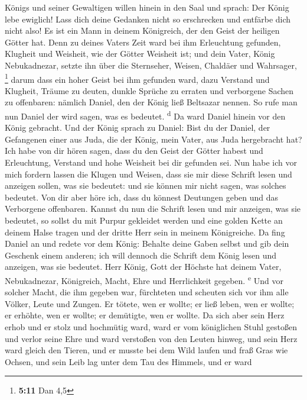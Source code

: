 Königs und seiner Gewaltigen willen hinein in den Saal und sprach: Der
König lebe ewiglich! Lass dich deine Gedanken nicht so erschrecken und
entfärbe dich nicht also!  Es ist ein Mann in deinem
Königreich, der den Geist der heiligen Götter hat. Denn zu deines Vaters
Zeit ward bei ihm Erleuchtung gefunden, Klugheit und Weisheit, wie der
Götter Weisheit ist; und dein Vater, König Nebukadnezar, setzte ihn über
die Sternseher, Weisen, Chaldäer und Wahrsager, \footnote{\textbf{5:11}
  Dan 4,5}  darum dass ein hoher Geist bei ihm gefunden
ward, dazu Verstand und Klugheit, Träume zu deuten, dunkle Sprüche zu
erraten und verborgene Sachen zu offenbaren: nämlich Daniel, den der
König ließ Beltsazar nennen. So rufe man nun Daniel der wird sagen, was
es bedeutet. \textsuperscript{d}  Da ward Daniel hinein
vor den König gebracht. Und der König sprach zu Daniel: Bist du der
Daniel, der Gefangenen einer aus Juda, die der König, mein Vater, aus
Juda hergebracht hat?  Ich habe von dir hören sagen, dass
du den Geist der Götter habest und Erleuchtung, Verstand und hohe
Weisheit bei dir gefunden sei.  Nun habe ich vor mich
fordern lassen die Klugen und Weisen, dass sie mir diese Schrift lesen
und anzeigen sollen, was sie bedeutet: und sie können mir nicht sagen,
was solches bedeutet.  Von dir aber höre ich, dass du
könnest Deutungen geben und das Verborgene offenbaren. Kannst du nun die
Schrift lesen und mir anzeigen, was sie bedeutet, so sollst du mit
Purpur gekleidet werden und eine golden Kette an deinem Halse tragen und
der dritte Herr sein in meinem Königreiche.  Da fing
Daniel an und redete vor dem König: Behalte deine Gaben selbst und gib
dein Geschenk einem anderen; ich will dennoch die Schrift dem König
lesen und anzeigen, was sie bedeutet.  Herr König, Gott
der Höchste hat deinem Vater, Nebukadnezar, Königreich, Macht, Ehre und
Herrlichkeit gegeben. \textsuperscript{e}  Und vor
solcher Macht, die ihm gegeben war, fürchteten und scheuten sich vor ihm
alle Völker, Leute und Zungen. Er tötete, wen er wollte; er ließ leben,
wen er wollte; er erhöhte, wen er wollte; er demütigte, wen er wollte.
 Da sich aber sein Herz erhob und er stolz und hochmütig
ward, ward er vom königlichen Stuhl gestoßen und verlor seine Ehre
 und ward verstoßen von den Leuten hinweg, und sein Herz
ward gleich den Tieren, und er musste bei dem Wild laufen und fraß Gras
wie Ochsen, und sein Leib lag unter dem Tau des Himmels, und er ward
